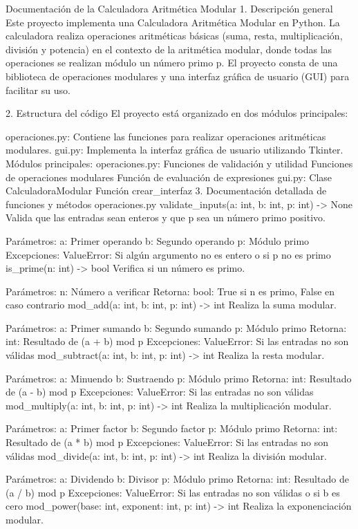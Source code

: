 Documentación de la Calculadora Aritmética Modular
1. Descripción general
Este proyecto implementa una Calculadora Aritmética Modular en Python. La calculadora realiza operaciones aritméticas básicas (suma, resta, multiplicación, división y potencia) en el contexto de la aritmética modular, donde todas las operaciones se realizan módulo un número primo p. El proyecto consta de una biblioteca de operaciones modulares y una interfaz gráfica de usuario (GUI) para facilitar su uso.

2. Estructura del código
El proyecto está organizado en dos módulos principales:

operaciones.py: Contiene las funciones para realizar operaciones aritméticas modulares.
gui.py: Implementa la interfaz gráfica de usuario utilizando Tkinter.
Módulos principales:
operaciones.py:
Funciones de validación y utilidad
Funciones de operaciones modulares
Función de evaluación de expresiones
gui.py:
Clase CalculadoraModular
Función crear_interfaz
3. Documentación detallada de funciones y métodos
operaciones.py
validate_inputs(a: int, b: int, p: int) -> None
Valida que las entradas sean enteros y que p sea un número primo positivo.

Parámetros:
a: Primer operando
b: Segundo operando
p: Módulo primo
Excepciones:
ValueError: Si algún argumento no es entero o si p no es primo
is_prime(n: int) -> bool
Verifica si un número es primo.

Parámetros:
n: Número a verificar
Retorna:
bool: True si n es primo, False en caso contrario
mod_add(a: int, b: int, p: int) -> int
Realiza la suma modular.

Parámetros:
a: Primer sumando
b: Segundo sumando
p: Módulo primo
Retorna:
int: Resultado de (a + b) mod p
Excepciones:
ValueError: Si las entradas no son válidas
mod_subtract(a: int, b: int, p: int) -> int
Realiza la resta modular.

Parámetros:
a: Minuendo
b: Sustraendo
p: Módulo primo
Retorna:
int: Resultado de (a - b) mod p
Excepciones:
ValueError: Si las entradas no son válidas
mod_multiply(a: int, b: int, p: int) -> int
Realiza la multiplicación modular.

Parámetros:
a: Primer factor
b: Segundo factor
p: Módulo primo
Retorna:
int: Resultado de (a * b) mod p
Excepciones:
ValueError: Si las entradas no son válidas
mod_divide(a: int, b: int, p: int) -> int
Realiza la división modular.

Parámetros:
a: Dividendo
b: Divisor
p: Módulo primo
Retorna:
int: Resultado de (a / b) mod p
Excepciones:
ValueError: Si las entradas no son válidas o si b es cero
mod_power(base: int, exponent: int, p: int) -> int
Realiza la exponenciación modular.

